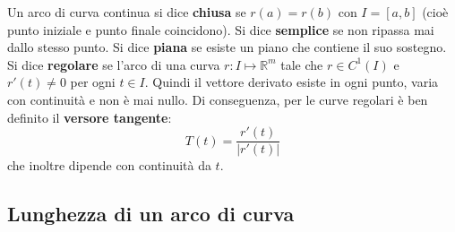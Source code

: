 \documentclass[a4paper]{article}
\numberwithin{equation}{subsection}
\begin{document}
\begin{figure}[H]
\centering
{}
\end{figure}
\dfn{}
{
    Un arco di curva continua si dice \textbf{chiusa} se $r(a) = r(b)$ con $I = [a,b]$ (cioè punto iniziale e punto finale coincidono).
    Si dice \textbf{semplice} se non ripassa mai dallo stesso punto. Si dice \textbf{piana} se esiste un piano che contiene il suo sostegno.\\
    Si dice \textbf{regolare} se l'arco di una curva $r: I \mapsto \mathbb{R}^m$ tale che $r \in C^1(I)$ e $r'(t) \neq 0$ per ogni $t \in I$. 
}
Quindi il vettore derivato esiste in ogni punto, varia con continuità e non è mai nullo.
Di conseguenza, per le curve regolari è ben definito il \textbf{versore tangente}:
\[T(t) = \frac{r'(t)}{|r'(t)|}\]
che inoltre dipende con continuità da $t$.

\subsection{Lunghezza di un arco di curva}
\end{document}
